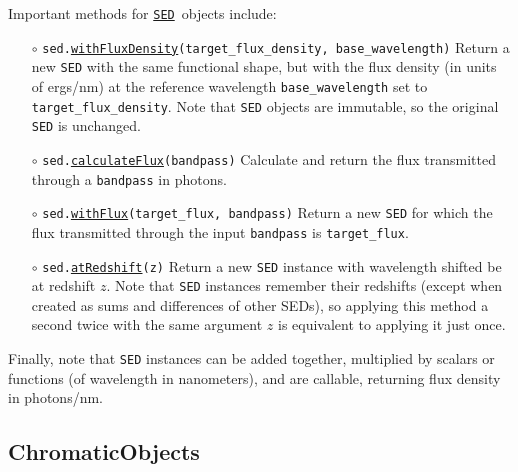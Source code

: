 \documentclass[preprint,10pt]{../../devel/modules/aastex}
\newcommand\SED{\href{http://galsim-developers.github.io/GalSim/classgalsim_1_1sed_1_1_s_e_d.html}{\texttt{SED}}}
\begin{document}
Important methods for \SED\ objects include:
\begin{itemize}
  \item[$\circ$]
  \texttt{sed.\href{http://galsim-developers.github.io/GalSim/classgalsim_1_1sed_1_1_s_e_d.html\#abd38352d0cd9327ba255b8f327562992}{withFluxDensity}(target\_flux\_density,
    base\_wavelength)}
      \newline
      Return a new \texttt{SED} with the same functional shape,
      but with the flux
      density (in units of ergs/nm) at the reference
      wavelength \texttt{base\_wavelength} set to
      \texttt{target\_flux\_density}.  Note that \texttt{SED} objects are
      immutable, so the original \texttt{SED} is unchanged.
  \item[$\circ$]
  \texttt{sed.\href{http://galsim-developers.github.io/GalSim/classgalsim_1_1sed_1_1_s_e_d.html\#ab20b0c861f5b6a6604fe838b83a4d6cc}{calculateFlux}(bandpass)}
    \newline
    Calculate and return the flux transmitted through a
    \texttt{bandpass} in photons.
  \item[$\circ$]
  \texttt{sed.\href{http://galsim-developers.github.io/GalSim/classgalsim_1_1sed_1_1_s_e_d.html\#a33613fdc3b0f99534971e9651ea2e659}{withFlux}(target\_flux, bandpass)}
    \newline
    Return a new \texttt{SED}
    for which the flux transmitted through the input \texttt{bandpass} is \texttt{target\_flux}.
  \item[$\circ$]
  \texttt{sed.\href{http://galsim-developers.github.io/GalSim/classgalsim_1_1sed_1_1_s_e_d.html\#a9d49d109ff539f61ab022e1be6391b12}{atRedshift}(z)}
    \newline
    Return a new \texttt{SED} instance with wavelength shifted be at redshift $z$.
    Note that \texttt{SED} instances remember their redshifts (except when created as sums and
    differences of
    other SEDs), so applying this method a second twice with the same argument $z$ is equivalent
    to applying it just once.
\end{itemize}

Finally, note that \texttt{SED} instances can be added together, multiplied by scalars or functions
(of wavelength in nanometers), and are callable, returning flux density in photons/nm.

\subsection{ChromaticObjects}
\end{document}
